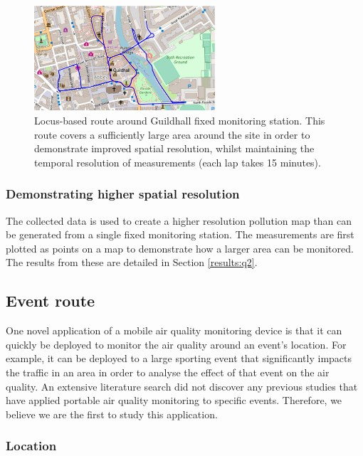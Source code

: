 \documentclass[11pt]{report}
\begin{document}
\begin{figure}[!tb]
\centering
\includegraphics[width=0.6\textwidth]{images/locus_route}
\caption[Locus-based route.]{Locus-based route around Guildhall fixed monitoring station. This route covers a sufficiently large area around the site in order to demonstrate improved spatial resolution, whilst maintaining the temporal resolution of measurements (each lap takes 15 minutes).}
\label{fig: locus_route}
\end{figure}

\subsubsection{Demonstrating higher spatial resolution}

The collected data is used to create a higher resolution pollution map than can be generated from a single fixed monitoring station. The measurements are first plotted as points on a map to demonstrate how a larger area can be monitored. The results from these are detailed in Section \ref{results:q2}. %


\subsection{Event route} \label{sec:event}

One novel application of a mobile air quality monitoring device is that it can quickly be deployed to monitor the air quality around an event's location. For example, it can be deployed to a large sporting event that significantly impacts the traffic in an area in order to analyse the effect of that event on the air quality. An extensive literature search did not discover any previous studies that have applied portable air quality monitoring to specific events. Therefore, we believe we are the first to study this application.

\subsubsection{Location}
\end{document}
